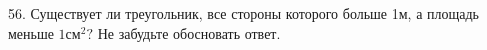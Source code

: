 56. Существует ли треугольник, все стороны которого больше 1м, а площадь меньше $1\text{см}^2?$ Не забудьте обосновать ответ.\\
